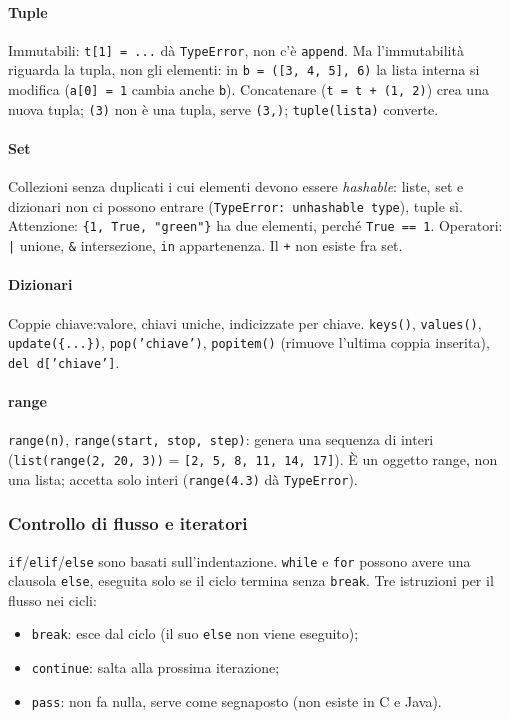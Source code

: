 \documentclass[a4paper,12pt]{article}
\begin{document}
\paragraph{Tuple} Immutabili: \texttt{t[1] = ...} dà \texttt{TypeError}, non c'è
\texttt{append}. Ma l'immutabilità riguarda la tupla, non gli elementi: in \texttt{b = ([3, 4, 5], 6)}
la lista interna si modifica (\texttt{a[0] = 1} cambia anche \texttt{b}). Concatenare
(\texttt{t = t + (1, 2)}) crea una nuova tupla; \texttt{(3)} non è una tupla, serve
\texttt{(3,)}; \texttt{tuple(lista)} converte.

\paragraph{Set} Collezioni senza duplicati i cui elementi devono essere \emph{hashable}:
liste, set e dizionari non ci possono entrare (\texttt{TypeError: unhashable type}), tuple
sì. Attenzione: \texttt{\{1, True, "green"\}} ha due elementi, perché \texttt{True == 1}.
Operatori: \texttt{|} unione, \texttt{\&} intersezione, \texttt{in} appartenenza. Il
\texttt{+} non esiste fra set.

\paragraph{Dizionari} Coppie chiave:valore, chiavi uniche, indicizzate per chiave.
\texttt{keys()}, \texttt{values()}, \texttt{update(\{...\})}, \texttt{pop('chiave')},
\texttt{popitem()} (rimuove l'ultima coppia inserita), \texttt{del d['chiave']}.

\paragraph{range} \texttt{range(n)}, \texttt{range(start, stop, step)}: genera una sequenza
di interi (\texttt{list(range(2, 20, 3))} = \texttt{[2, 5, 8, 11, 14, 17]}). È un oggetto
range, non una lista; accetta solo interi (\texttt{range(4.3)} dà \texttt{TypeError}).

\subsubsection{Controllo di flusso e iteratori}
\texttt{if}/\texttt{elif}/\texttt{else} sono basati sull'indentazione. \texttt{while} e
\texttt{for} possono avere una clausola \texttt{else}, eseguita solo se il ciclo termina
senza \texttt{break}. Tre istruzioni per il flusso nei cicli:
\begin{itemize}[nosep]
  \item \texttt{break}: esce dal ciclo (il suo \texttt{else} non viene eseguito);
  \item \texttt{continue}: salta alla prossima iterazione;
  \item \texttt{pass}: non fa nulla, serve come segnaposto (non esiste in C e Java).
\end{itemize}
\end{document}
